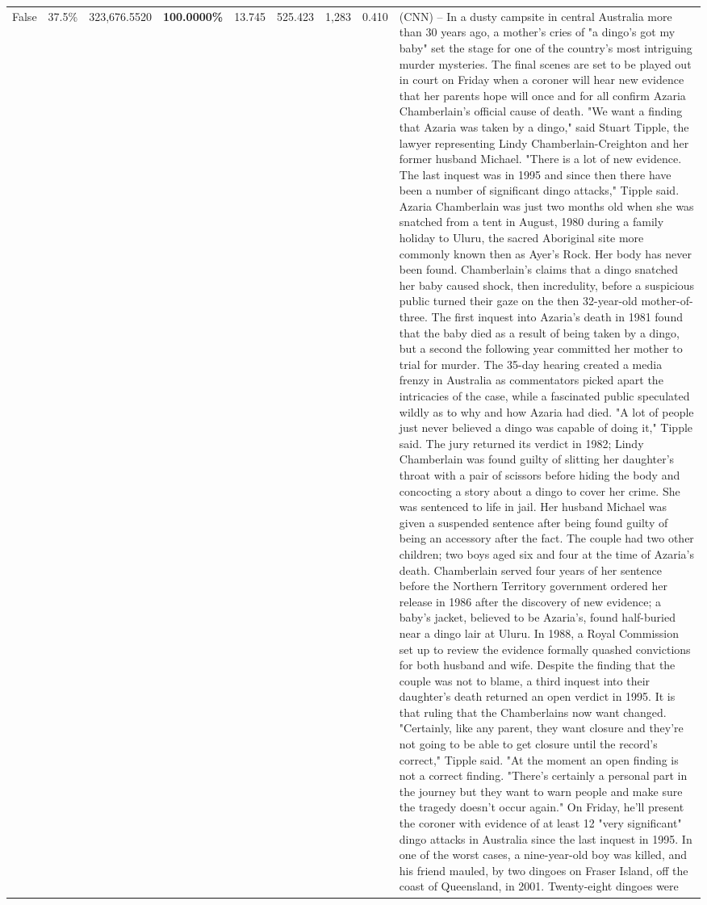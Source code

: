\begin{table}[H]
\begin{tabular}{lllrlllll}
False & 37.5\% & 323,676.5520 & \bfseries \color{red} 100.0000\% & 13.745 & 525.423 & 1,283 & 0.410 & (CNN) -- In a dusty campsite in central Australia more than 30 years ago, a mother's cries of "a dingo's got my baby" set the stage for one of the country's most intriguing murder mysteries. The final scenes are set to be played out in court on Friday when a coroner will hear new evidence that her parents hope will once and for all confirm Azaria Chamberlain's official cause of death. "We want a finding that Azaria was taken by a dingo," said Stuart Tipple, the lawyer representing Lindy Chamberlain-Creighton and her former husband Michael. "There is a lot of new evidence. The last inquest was in 1995 and since then there have been a number of significant dingo attacks," Tipple said. Azaria Chamberlain was just two months old when she was snatched from a tent in August, 1980 during a family holiday to Uluru, the sacred Aboriginal site more commonly known then as Ayer's Rock. Her body has never been found. Chamberlain's claims that a dingo snatched her baby caused shock, then incredulity, before a suspicious public turned their gaze on the then 32-year-old mother-of-three. The first inquest into Azaria's death in 1981 found that the baby died as a result of being taken by a dingo, but a second the following year committed her mother to trial for murder. The 35-day hearing created a media frenzy in Australia as commentators picked apart the intricacies of the case, while a fascinated public speculated wildly as to why and how Azaria had died. "A lot of people just never believed a dingo was capable of doing it," Tipple said. The jury returned its verdict in 1982; Lindy Chamberlain was found guilty of slitting her daughter's throat with a pair of scissors before hiding the body and concocting a story about a dingo to cover her crime. She was sentenced to life in jail. Her husband Michael was given a suspended sentence after being found guilty of being an accessory after the fact. The couple had two other children; two boys aged six and four at the time of Azaria's death. Chamberlain served four years of her sentence before the Northern Territory government ordered her release in 1986 after the discovery of new evidence; a baby's jacket, believed to be Azaria's, found half-buried near a dingo lair at Uluru. In 1988, a Royal Commission set up to review the evidence formally quashed convictions for both husband and wife. Despite the finding that the couple was not to blame, a third inquest into their daughter's death returned an open verdict in 1995. It is that ruling that the Chamberlains now want changed. "Certainly, like any parent, they want closure and they're not going to be able to get closure until the record's correct," Tipple said. "At the moment an open finding is not a correct finding. "There's certainly a personal part in the journey but they want to warn people and make sure the tragedy doesn't occur again." On Friday, he'll present the coroner with evidence of at least 12 "very significant" dingo attacks in Australia since the last inquest in 1995. In one of the worst cases, a nine-year-old boy was killed, and his friend mauled, by two dingoes on Fraser Island, off the coast of Queensland, in 2001. Twenty-eight dingoes were 
\end{tabular}
\end{table}
